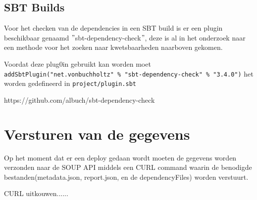 \subsection{SBT Builds}
Voor het checken van de dependencies in een SBT build is er een plugin beschikbaar genaamd $"$sbt-dependency-check$"$, deze is al in het onderzoek naar een methode voor het zoeken naar kwetsbaarheden naarboven gekomen.

Voordat deze plug0in gebruikt kan worden moet \texttt{addSbtPlugin("net.vonbuchholtz" \% "sbt-dependency-check" \% "3.4.0")} het worden gedefineerd in \texttt{project/plugin.sbt}


https://github.com/albuch/sbt-dependency-check

\section{Versturen van de gegevens}
Op het moment dat er een deploy gedaan wordt moeten de gegevens worden verzonden naar de SOUP API middels een CURL command waarin de benodigde bestanden(metadata.json, report.json, en de dependencyFiles) worden verstuurt.

CURL uitkouwen......
